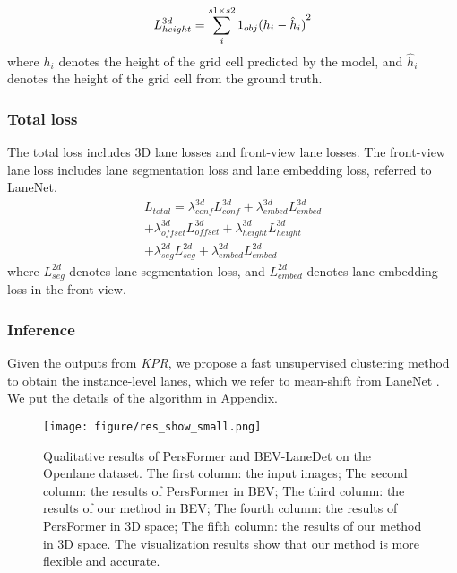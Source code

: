 \documentclass[10pt,twocolumn,letterpaper]{article}
\begin{document}
\begin{equation}
L_{height}^{3d} = \sum\limits_i^{s1 \times s2} {{{\rm{1}}_{obj}}{{({h_i} - {{\hat h}_i})}^2}}
\end{equation}
where $h_i$ denotes the height of the grid cell predicted by the model, and ${\hat h}_i$ denotes the height of the grid cell from the ground truth.

\subsubsection{Total loss}
The total loss includes 3D lane losses and front-view lane losses. The front-view lane loss includes lane segmentation loss and lane embedding loss,  referred to LaneNet\cite{neven2018towards}.
\begin{equation}
\begin{split}
{L_{total}} = \lambda _{conf}^{3d}L_{conf}^{3d} + \lambda _{embed}^{3d}L_{embed}^{3d} \\
	+ \lambda _{offset}^{3d}L_{offset}^{3d} + \lambda _{height}^{3d}L_{height}^{3d}\\
     + \lambda _{seg}^{2d}L_{seg}^{2d} + \lambda _{embed}^{2d}L_{embed}^{2d}
\end{split}
\end{equation}
where $L_{seg}^{2d}$ denotes lane segmentation loss, and $L_{embed}^{2d}$ denotes lane embedding loss in the front-view.


\subsubsection{Inference}
Given the outputs from \textit{KPR}, we propose a fast unsupervised clustering method to obtain the instance-level lanes, which we refer to mean-shift from LaneNet \cite{neven2018towards}. We put the details of the algorithm in Appendix.
\begin{figure*}[t]
    \centering
\texttt{[image: figure/res\_show\_small.png]}
\caption{Qualitative results of PersFormer\cite{chen2022persformer} and BEV-LaneDet on the Openlane dataset. The first column: the input images; The second column: the results of PersFormer in BEV; The third column: the results of our method in BEV; The fourth column:  the results of PersFormer in 3D space; The fifth column: the results of our method in 3D space. The visualization results show that our method is more flexible and accurate.}
    \label{fig:show}
\end{figure*}
\end{document}
